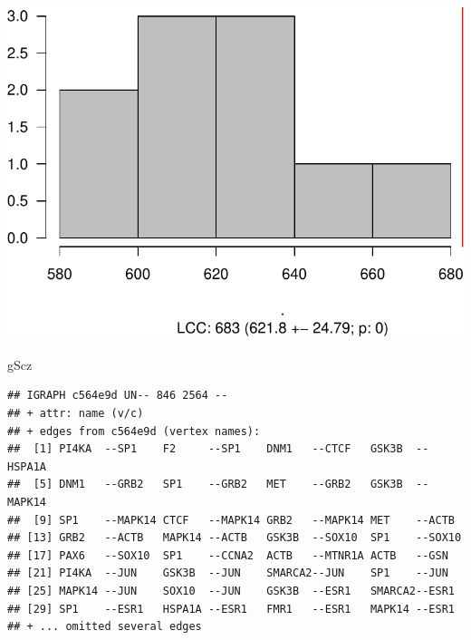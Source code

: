 \documentclass[
]{book}
\newenvironment{Shaded}{\begin{snugshade}}{\end{snugshade}}
\newcommand{\NormalTok}[1]{#1}
\begin{document}
\includegraphics{NetMed_files/figure-latex/unnamed-chunk-23-1.pdf}

\begin{Shaded}
\begin{Highlighting}[]
\NormalTok{gScz }
\end{Highlighting}
\end{Shaded}

\begin{verbatim}
## IGRAPH c564e9d UN-- 846 2564 -- 
## + attr: name (v/c)
## + edges from c564e9d (vertex names):
##  [1] PI4KA  --SP1    F2     --SP1    DNM1   --CTCF   GSK3B  --HSPA1A
##  [5] DNM1   --GRB2   SP1    --GRB2   MET    --GRB2   GSK3B  --MAPK14
##  [9] SP1    --MAPK14 CTCF   --MAPK14 GRB2   --MAPK14 MET    --ACTB  
## [13] GRB2   --ACTB   MAPK14 --ACTB   GSK3B  --SOX10  SP1    --SOX10 
## [17] PAX6   --SOX10  SP1    --CCNA2  ACTB   --MTNR1A ACTB   --GSN   
## [21] PI4KA  --JUN    GSK3B  --JUN    SMARCA2--JUN    SP1    --JUN   
## [25] MAPK14 --JUN    SOX10  --JUN    GSK3B  --ESR1   SMARCA2--ESR1  
## [29] SP1    --ESR1   HSPA1A --ESR1   FMR1   --ESR1   MAPK14 --ESR1  
## + ... omitted several edges
\end{verbatim}
\end{document}
